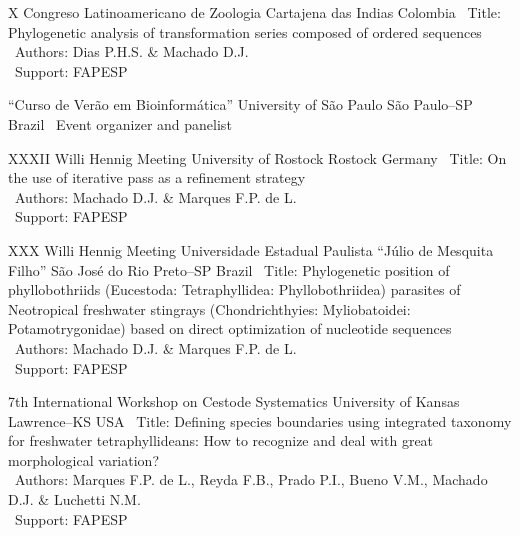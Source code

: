 \vspace{.5em}

\cventry{---}
	{X Congreso Latinoamericano de Zoologia}
	{Cartajena das Indias}
	{Colombia}
	{}
	{
		\textbullet~Title: Phylogenetic analysis of transformation series composed of ordered sequences\\
		\textbullet~Authors: Dias P.H.S. \& Machado D.J.\\
		\textbullet~Support: FAPESP
	}

\vspace{.5em}

\cventry{---}
	{``Curso de Verão em Bioinformática''}
	{University of São Paulo}
	{São Paulo--SP}
	{Brazil}
	{
		\textbullet~Event organizer and panelist
	}

\vspace{.5em}

	{XXXII Willi Hennig Meeting}
	{University of Rostock}
	{Rostock}
	{Germany}
	{
		\textbullet~Title: On the use of iterative pass as a refinement strategy\\
		\textbullet~Authors: Machado D.J. \& Marques F.P. de L.\\
		\textbullet~Support: FAPESP
	}

\vspace{.5em}

	{XXX Willi Hennig Meeting}
	{Universidade Estadual Paulista ``Júlio de Mesquita Filho''}
	{São José do Rio Preto--SP}
	{Brazil}
	{
		\textbullet~Title: Phylogenetic position of phyllobothriids (Eucestoda: Tetraphyllidea: Phyllobothriidea) parasites of Neotropical freshwater stingrays (Chondrichthyies: Myliobatoidei: Potamotrygonidae) based on direct optimization of nucleotide sequences\\
		\textbullet~Authors: Machado D.J. \& Marques F.P. de L.\\
		\textbullet~Support: FAPESP
	}

\vspace{.5em}

\cventry{---}
	{7th International Workshop on Cestode Systematics}
	{University of Kansas}
	{Lawrence--KS}
	{USA}
	{
		\textbullet~Title: Defining species boundaries using integrated taxonomy for freshwater tetraphyllideans: How to recognize and deal with great morphological variation?\\
		\textbullet~Authors: Marques F.P. de L., Reyda F.B., Prado P.I., Bueno V.M., Machado D.J. \& Luchetti N.M.\\
		\textbullet~Support: FAPESP
	}

